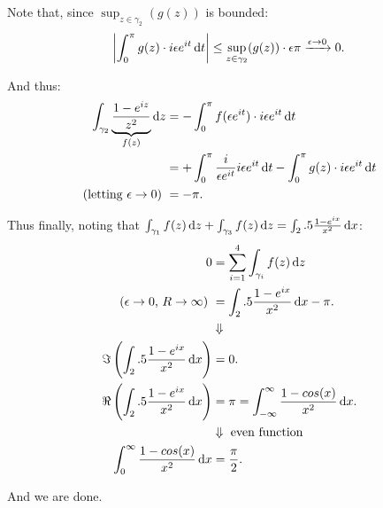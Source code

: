 \begin{example}
Note that, since $\sup_{z\in \gamma_2} (g(z))$ is bounded:
\begin{align*}
    \abs{\int_0^\pi g(z) \cdot i \epsilon e^{it} \dif t} \leq \sup_{z\in \gamma_2} (g(z)) \cdot \epsilon \pi \xrightarrow[]{\epsilon \to 0} 0.
\end{align*}


And thus:
\begin{align*}
    \int_{\gamma_2} \underbrace{\frac{ 1- e^{iz}}{ z^2}}_{f(z)} \dif z &= - \int_0^{\pi} f(\epsilon e^{it} ) \cdot i \epsilon e^{it} \dif t\\
    &= + \int_0^{\pi} \frac{i}{ \epsilon e^{it}} i \epsilon e^{it} \dif t - \int_0^\pi g(z) \cdot i \epsilon e^{it} \dif t\\
   \text{(letting $\epsilon \to 0$) } &= -\pi.
\end{align*}

Thus finally, noting that $\int_{\gamma_1} f(z) \dif z + \int_{\gamma_3} f(z) \dif z = \int_\R \frac{ 1- e^{ix}}{ x^2} \dif x$:
\begin{align*}
    0 &= \sum_{i=1}^4 \int_{\gamma_i} f(z) \dif z \\
    \text{($\epsilon \to 0$, $R \to \infty$) }&= \int_\R \frac{ 1- e^{ix}}{ x^2} \dif x - \pi. \\
   &\Downarrow\\
    \Im \left( \int_\R \frac{ 1- e^{ix}}{ x^2} \dif x \right) &=  0.\\
    \Re \left( \int_\R \frac{ 1- e^{ix}}{ x^2} \dif x \right) &=  \pi = \int_{-\infty}^{\infty} \frac{ 1- cos(x)}{ x^2} \dif x.\\
    &\Downarrow \text{ even function}\\
    \int_0^{\infty} \frac{ 1- cos(x)}{ x^2} \dif x &= \frac{\pi}{2}.\\
\end{align*}

And we are done.

\end{example}




